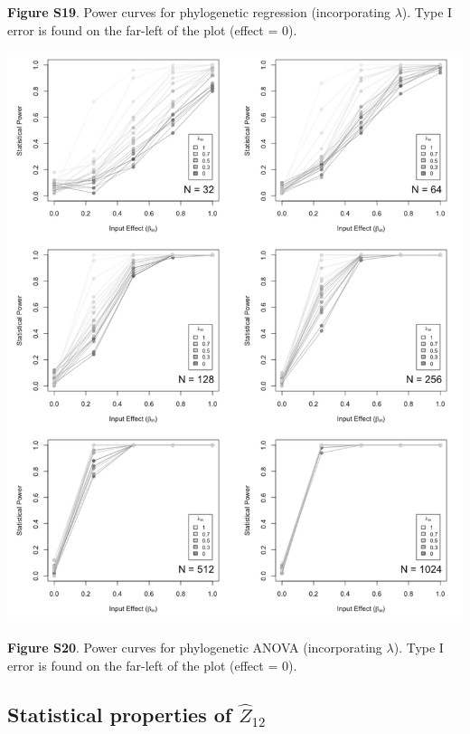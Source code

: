 \documentclass[
]{article}
\begin{document}
\textbf{Figure S19}. Power curves for phylogenetic regression
(incorporating \(\lambda\)). Type I error is found on the far-left of
the plot (effect = 0).

\includegraphics[width=0.95\linewidth]{fig.S20}

\textbf{Figure S20}. Power curves for phylogenetic ANOVA (incorporating
\(\lambda\)). Type I error is found on the far-left of the plot (effect
= 0).

\newpage

\hypertarget{statistical-properties-of-hatz_12}{%
\subsection{\texorpdfstring{Statistical properties of
\(\hat{Z}_{12}\)}{Statistical properties of \textbackslash hat\{Z\}\_\{12\}}}\label{statistical-properties-of-hatz_12}}
\end{document}
